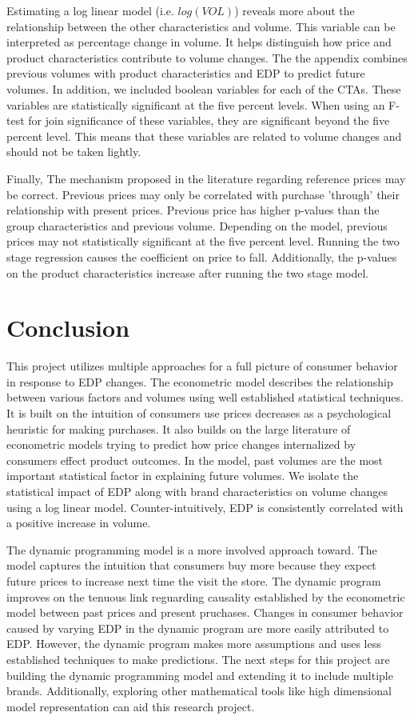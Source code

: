 \documentclass{article}
\begin{document}
Estimating a log linear model (i.e. $log(VOL)$) reveals more about the relationship between the other characteristics and volume. This variable can be interpreted as percentage change in volume. It helps distinguish how price and product characteristics contribute to volume changes. The the appendix combines previous volumes with product characteristics and EDP to predict future volumes. In addition, we included boolean variables for each of the CTAs. These variables are statistically significant at the five percent levels. When using an F-test for join significance of these variables, they are significant beyond the five percent level. This means that these variables are related to volume changes and should not be taken lightly. 

Finally, The mechanism proposed in the literature regarding reference prices may be correct. Previous prices may only be correlated with purchase 'through' their relationship with present prices. Previous price has higher p-values than the group characteristics and previous volume. Depending on the model, previous prices may not statistically significant at the five percent level. Running the two stage regression causes the coefficient on price to fall. Additionally, the p-values on the product characteristics increase after running the two stage model.

\section{Conclusion}

This project utilizes multiple approaches for a full picture of consumer behavior in response to EDP changes. The econometric model describes the relationship between various factors and volumes using well established statistical techniques. It is built on the intuition of consumers use prices decreases as a psychological heuristic for making purchases. It also builds on the large literature of econometric models trying to predict how price changes internalized by consumers effect product outcomes. In the model, past volumes are the most important statistical factor in explaining future volumes. We isolate the statistical impact of EDP along with brand characteristics on volume changes using a log linear model. Counter-intuitively, EDP is consistently correlated with a positive increase in volume.

The dynamic programming model is a more involved approach toward. The model captures the intuition that consumers buy more because they expect future prices to increase next time the visit the store. The dynamic program improves on the tenuous link reguarding causality established by the econometric model between past prices and present pruchases. Changes in consumer behavior caused by varying EDP in the dynamic program are more easily attributed to EDP. However, the dynamic program makes more assumptions and uses less established techniques to make predictions. The next steps for this project are building the dynamic programming model and extending it to include multiple brands. Additionally, exploring other mathematical tools like high dimensional model representation can aid this research project. 
\end{document}
